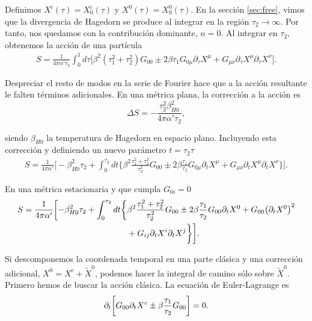 Definimos $X^i(\tau)=X^i_0(\tau)$ y $X^0(\tau)=X_0^0(\tau)$.
En la sección \ref{sec:free}, vimos que la divergencia de Hagedorn se produce al integrar en la región $\tau_2\to\infty$.
Por tanto, nos quedamos con la contribución dominante, $n=0$.
Al integrar en $\tau_2$, obtenemos la acción de una partícula
\begin{equation}
  \begin{aligned}
    S=\frac{1}{4\pi\alpha'\tau_2}\int_0^1 d\tau \big[
      \beta^2 (\tau_1^2+\tau_2^2)G_{00} \pm 2\beta\tau_1 G_{0\mu}\partial_\tau X^\mu  +G_{\mu\nu} \partial_\tau X^\mu \partial_\tau X^\nu
    \big].
  \end{aligned}
\end{equation}

Despreciar el resto de modos en la serie de Fourier hace que a la acción resultante le falten
términos adicionales. 
En una métrica plana, la corrección a la acción es
\begin{equation}
  \Delta S = - \frac{\tau_2^2 \beta^2_{H0}}{4\pi\alpha' \tau_2},
\end{equation}

siendo $\beta_{H0}$ la temperatura de Hagedorn en espacio plano.
Incluyendo esta corrección y definiendo un nuevo parámetro $t=\tau_2 \tau$ 
\begin{equation}
  \begin{aligned}
    S=\frac{1}{4\pi\alpha'}\biggl[ -\beta_{H0}^2\tau_2 + \int_0^{\tau_2} dt \biggl\{
      \beta^2 \frac{\tau_1^2+\tau_2^2}{\tau_2^2}G_{00} \pm 2\beta\frac{\tau_1}{\tau_2} G_{0\mu}\partial_t X^\mu  +G_{\mu\nu} \partial_t X^\mu \partial_t X^\nu
    \biggl\}\biggl].
  \end{aligned}
\end{equation}

En una métrica estacionaria y que cumpla $G_{0i}=0$
\begin{equation}
  \begin{aligned}
    S=\frac{1}{4\pi\alpha'}\biggl[ -\beta_{H0}^2\tau_2 + \int_0^{\tau_2} dt \biggl\{&
      \beta^2 \frac{\tau_1^2+\tau_2^2}{\tau_2^2}G_{00} \pm 2\beta\frac{\tau_1}{\tau_2} G_{00}\partial_t X^0  +G_{00} \qty(\partial_t X^0)^2 \\
    &+G_{ij} \partial_t X^i \partial_t X^j
    \biggl\}\biggl].
  \end{aligned}
\end{equation}

Si descomponemos la coordenada temporal en una parte clásica y una corrección adicional,
$X^0=X^{c}+\tilde X^0$, podemos hacer la integral de camino sólo sobre $\tilde X^0$. 
Primero hemos de buscar la acción clásica.
La ecuación de Euler-Lagrange es 
\begin{equation}
  \partial_t\qty[G_{00}\partial_t X^c \pm \beta \frac{\tau_1}{\tau_2}G_{00}]=0.
\end{equation}

